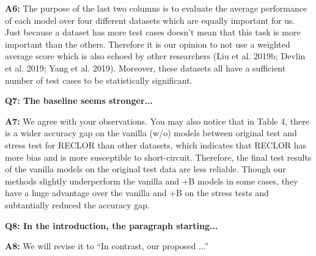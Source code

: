 \documentclass[letterpaper]{article}
\begin{document}
\noindent
\textbf{A6:} The purpose of the last two columns is to evaluate the 
average performance of each model over four different datasets which are equally important for us. 
Just because a dataset has more 
test cases doesn't mean that this task is more important than the others. 
Therefore it is our opinion to not 
use a weighted average score 
which is also echoed by other researchers (Liu et al. 2019b; Devlin et al. 2019; Yang et al. 2019).
Moreover, these datasets all have a sufficient number of test cases to be statistically significant. 

\noindent
\textbf{Q7: The baseline seems stronger...}

\noindent
\textbf{A7:} We agree with your observations. 
You may also notice that in Table 4, there is a wider accuracy gap on the vanilla (w/o) models
between original test and 
stress test for RECLOR than other datasets, which indicates that RECLOR has more bias and is 
more susceptible to short-circuit. 
Therefore, the final test results of the vanilla models on the original test data are less reliable. 
Though our methods slightly underperform the vanilla and +B models in some cases, 
they have a huge advantage over the vanilla and +B on the stress tests and 
subtantially reduced the accuracy gap.

\noindent
\textbf{Q8: In the introduction, the paragraph starting...}

\noindent
\textbf{A8:} We will revise it to ``In contrast, our proposed ...''

\end{document}
